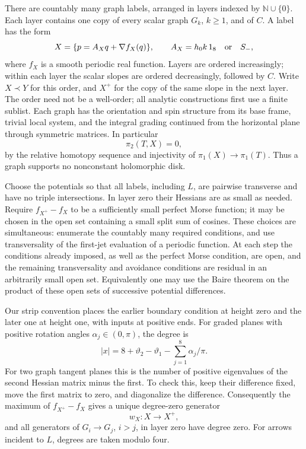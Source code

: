 \documentclass[11pt]{article}
\theoremstyle{definition}
\theoremstyle{remark}
\numberwithin{equation}{section}
\begin{document}
There are countably many graph labels, arranged in layers indexed by
$\mathbb N\cup\{0\}$.  Each layer contains one copy of every scalar graph $G_k$,
$k\geq1$, and of $C$.  A label has the form
\begin{equation}\label{local:graph}
 X=\{p=A_Xq+\nabla f_X(q)\},\qquad
 A_X=h_0k\,1_8\quad\hbox{or}\quad S_-,
\end{equation}
where $f_X$ is a smooth periodic real function.  Layers are ordered
increasingly; within each layer the scalar slopes are ordered decreasingly,
followed by $C$.  Write $X\prec Y$ for this order, and $X^+$ for the copy of
the same slope in the next layer.  The order need not be a well-order; all
analytic constructions first use a finite sublist.  Each graph has the
orientation and spin structure from its base frame, trivial local system,
and the integral grading continued from the horizontal plane through
symmetric matrices.  In particular
\[
 \pi_2(T,X)=0,
\]
by the relative homotopy sequence and injectivity of $\pi_1(X)\to\pi_1(T)$.
Thus a graph supports no nonconstant holomorphic disk.

Choose the potentials so that all labels, including $L$, are pairwise
transverse and have no triple intersections.  In layer zero their Hessians
are as small as needed.  Require $f_{X^+}-f_X$ to be a sufficiently small
perfect Morse function; it may be chosen in the open set containing a small
split sum of cosines.  These choices are simultaneous: enumerate the
countably many required conditions, and use transversality of the
first-jet evaluation of a periodic function.  At each step the conditions
already imposed, as well as the perfect Morse condition, are open, and the
remaining transversality and avoidance conditions are residual in an
arbitrarily small open set.  Equivalently one may use the Baire theorem on
the product of these open sets of successive potential differences.

Our strip convention places the earlier boundary condition at height zero
and the later one at height one, with inputs at positive ends.  For graded
planes with positive rotation angles $\alpha_j\in(0,\pi)$, the degree is
\begin{equation}\label{local:degree}
 |x|=8+\vartheta_2-\vartheta_1-\sum_{j=1}^8\alpha_j/\pi.
\end{equation}
For two graph tangent planes this is the number of positive eigenvalues of
the second Hessian matrix minus the first.  To check this, keep their
difference fixed, move the first matrix to zero, and diagonalize the
difference.  Consequently the maximum of $f_{X^+}-f_X$ gives a unique
degree-zero generator
\[
 w_X\colon X\longrightarrow X^+,
\]
and all generators of $G_i\to G_j$, $i>j$, in layer zero have degree zero.
For arrows incident to $L$, degrees are taken modulo four.
\end{document}
